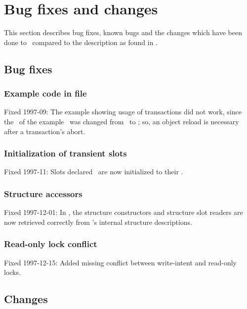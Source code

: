 
\chapter{Bug fixes and changes}

This section describes bug fixes, known bugs and the changes which
have been done to \plob\ compared to the description as found in
\cite{bib:Kirschke-94a}.

\section{Bug fixes}%
\label{sec:BugFixes}

\subsection[Example code]{Example code in file
  \protect{}}

Fixed 1997-09: The example showing usage of transactions did not work,
since the \ of the example \ was changed
from \ to ; so, an
object reload is necessary after a transaction's abort.

\subsection{Initialization of transient slots}

Fixed 1997-11: Slots declared \ are now initialized
to their .

\subsection{Structure accessors}

Fixed 1997-12-01: In \allegrocl, the structure constructors and
structure slot readers are now retrieved correctly from \allegro's
internal structure descriptions.

\subsection{Read-only lock conflict}

Fixed 1997-12-15: Added missing conflict between write-intent and
read-only locks.

\section{Changes}%
\label{sec:Changes}

